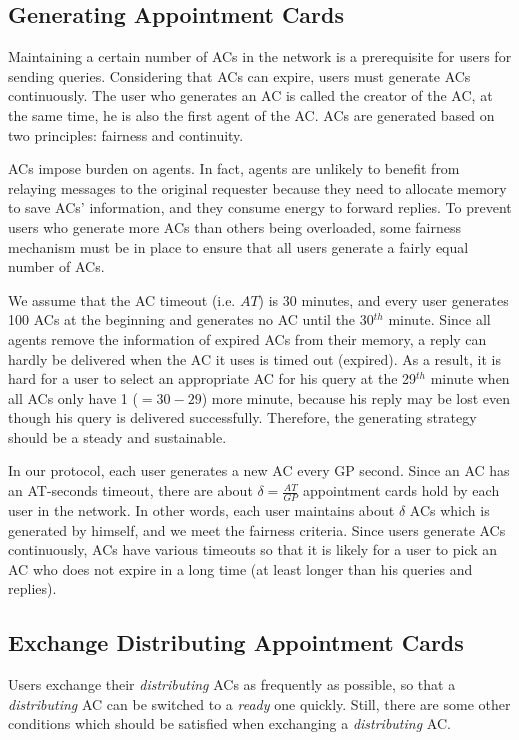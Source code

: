 \subsection{ Generating Appointment Cards}

\noindent Maintaining a certain number of ACs in the network is a prerequisite for users for sending queries. Considering that ACs can expire, users must generate ACs continuously. The user who generates an AC is called the creator of the AC, at the same time, he is also the first agent of the AC. ACs are generated based on two principles: fairness and continuity. 

ACs impose burden on agents. In fact, agents are unlikely to benefit from relaying messages to the original requester because they need to allocate memory to save ACs' information, and they consume energy to forward replies. To prevent users who generate more ACs than others being overloaded, some fairness mechanism must be in place to ensure that all users generate a fairly equal number of ACs.

We assume that the AC timeout (i.e. $AT$) is 30 minutes, and every user generates 100 ACs at the beginning and generates no AC until the 30${}^{th}$ minute. Since all agents remove the information of expired ACs from their memory, a reply can hardly be delivered when the AC it uses is timed out (expired). As a result, it is hard for a user to select an appropriate AC for his query at the 29${}^{th}$ minute when all ACs only have 1 ($=30-29$) more minute, because his reply may be lost even though his query is delivered successfully. Therefore, the generating strategy should be a steady and sustainable.

In our protocol, each user generates a new AC every GP second. Since an AC has an AT-seconds timeout, there are about $\delta =\frac{AT}{GP}$ appointment cards hold by each user in the network. In other words, each user maintains about $\delta$ ACs which is generated by himself, and we meet the fairness criteria. Since users generate ACs continuously, ACs have various timeouts so that it is likely for a user to pick an AC who does not expire in a long time (at least longer than his queries and replies).


\subsection{ Exchange Distributing Appointment Cards}

\noindent Users exchange their \textit{distributing} ACs as frequently as possible, so that a \textit{distributing} AC can be switched to a \textit{ready} one quickly. Still, there are some other conditions which should be satisfied when exchanging a \textit{distributing} AC.

